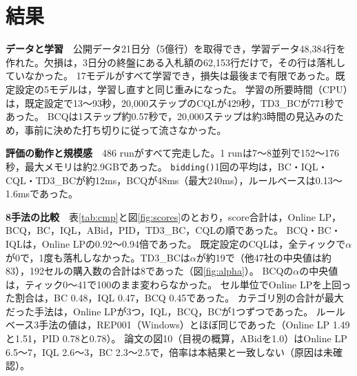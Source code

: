 \documentclass[twocolumn, 10pt]{ujarticle}
\begin{document}
\section{結果}\label{sec:e-result}

\textbf{データと学習}　公開データ21日分（5億行）を取得でき，学習データ48,384行を作れた。欠損は，3日分の終盤にある入札額の62,153行だけで，その行は落札していなかった。
17モデルがすべて学習でき，損失は最後まで有限であった。既定設定の5モデルは，学習し直すと同じ重みになった。
学習の所要時間（CPU）は，既定設定で13〜93秒，20,000ステップのCQLが429秒，TD3\_BCが771秒であった。
BCQは1ステップ約0.57秒で，20,000ステップは約3時間の見込みのため，事前に決めた打ち切りに従って流さなかった。

\textbf{評価の動作と規模感}　486 runがすべて完走した。1 runは7〜8並列で152〜176秒，最大メモリは約2.9GBであった。
\texttt{bidding()}1回の平均は，BC・IQL・CQL・TD3\_BCが約12ms，BCQが48ms（最大240ms），ルールベースは0.13〜1.6msであった。

\textbf{8手法の比較}　表\ref{tab:cmp}と図\ref{fig:scores}のとおり，score合計は，Online LP，BCQ，BC，IQL，ABid，PID，TD3\_BC，CQLの順であった。
BCQ・BC・IQLは，Online LPの0.92〜0.94倍であった。
既定設定のCQLは，全ティックで$\alpha$が0で，1度も落札しなかった。TD3\_BCは$\alpha$が約19で（他47社の中央値は約83），192セルの購入数の合計は8であった（図\ref{fig:alpha}）。
BCQの$\alpha$の中央値は，ティック0〜41で100のまま変わらなかった。
セル単位でOnline LPを上回った割合は，BC 0.48，IQL 0.47，BCQ 0.45であった。
カテゴリ別の合計が最大だった手法は，Online LPが3つ，IQL，BCQ，BCが1つずつであった。
ルールベース3手法の値は，REP001（Windows）とほぼ同じであった（Online LP 1.49と1.51，PID 0.78と0.78）。
論文の図10（目視の概算，ABidを1.0）はOnline LP 6.5〜7，IQL 2.6〜3，BC 2.3〜2.5で，倍率は本結果と一致しない（原因は未確認）。
\end{document}
